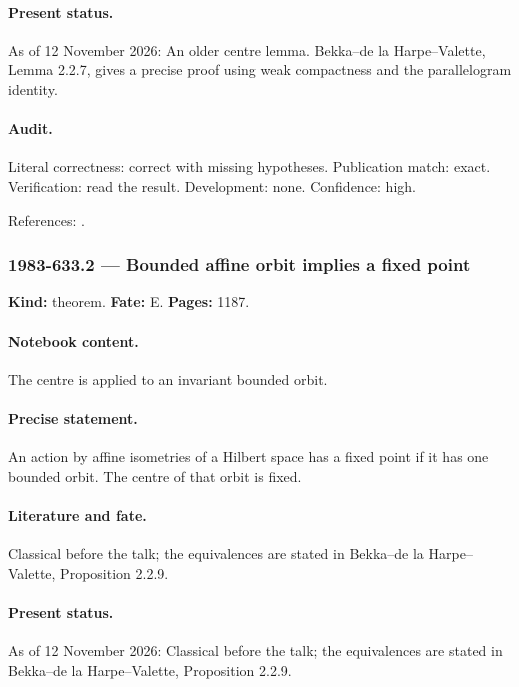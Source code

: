 \paragraph{Present status.} As of 12 November 2026: An older centre lemma. Bekka--de la Harpe--Valette, Lemma 2.2.7, gives a precise proof using weak compactness and the parallelogram identity.

\paragraph{Audit.} Literal correctness: correct with missing hypotheses. Publication match: exact. Verification: read the result. Development: none. Confidence: high.

\noindent References: \citep{bekkadelaharpevalette2008kazhdan}.\par

\subsubsection{1983-633.2 --- Bounded affine orbit implies a fixed point}

\label{item:1983-633.2}

\noindent\textbf{Kind:} theorem. \textbf{Fate:} E. \textbf{Pages:} 1187.\par

\paragraph{Notebook content.} The centre is applied to an invariant bounded orbit.

\paragraph{Precise statement.} An action by affine isometries of a Hilbert space has a fixed point if it has one bounded orbit. The centre of that orbit is fixed.

\paragraph{Literature and fate.} Classical before the talk; the equivalences are stated in Bekka--de la Harpe--Valette, Proposition 2.2.9.

\paragraph{Present status.} As of 12 November 2026: Classical before the talk; the equivalences are stated in Bekka--de la Harpe--Valette, Proposition 2.2.9.

